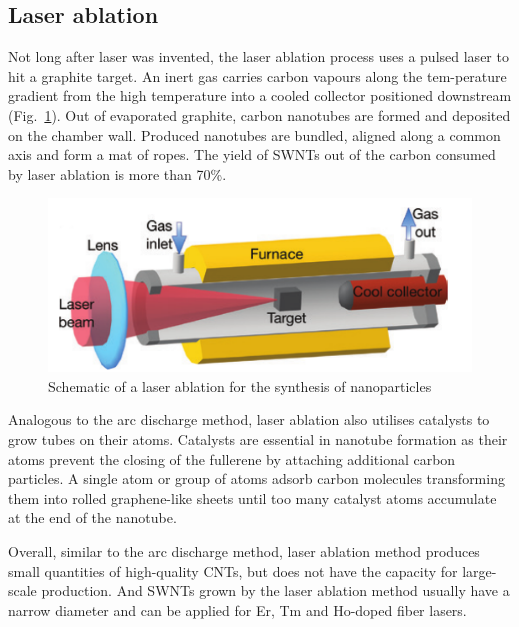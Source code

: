 \documentclass{phyasgn}\usepackage{nag}
\newcommand{\figref}[1]{Fig.~\ref{#1}}
\begin{document}
\subsection{Laser ablation}
Not long after laser was invented, the laser ablation process uses a pulsed laser to hit a graphite target\cite{hutchens2012vertically}. An inert gas carries carbon vapours along the tem-perature gradient from the high temperature into a cooled collector positioned downstream (\figref{7}). Out of evaporated graphite, carbon nanotubes are formed and deposited on the chamber wall. Produced nanotubes are bundled, aligned along a common axis and form a mat of ropes. The yield of SWNTs out of the carbon consumed by laser ablation is more than 70\%\cite{thess1996crystalline}. 
\begin{figure}[!h]
	\centering
	\includegraphics[width=.85\linewidth]{pic/7.png}
	\caption[Band structures]{Schematic of a laser ablation for the synthesis of nanoparticles\cite{hutchens2012vertically}}
	\label{7}
	\end{figure}
\par Analogous to the arc discharge method, laser ablation also utilises catalysts to grow tubes on their atoms\cite{yudasaka1997single}. Catalysts are essential in nanotube formation as their atoms prevent the closing of the fullerene by attaching additional carbon particles. A single atom or group of atoms adsorb carbon molecules transforming them into rolled graphene-like sheets until too many catalyst atoms accumulate at the end of the nanotube\cite{guo1995catalytic}.
\par Overall, similar to the arc discharge method, laser ablation method produces small quantities of high-quality CNTs, but does not have the capacity for large-scale production. And SWNTs grown by the laser ablation method usually have a narrow diameter and can be applied for Er, Tm and Ho-doped fiber lasers. 
\end{document}
